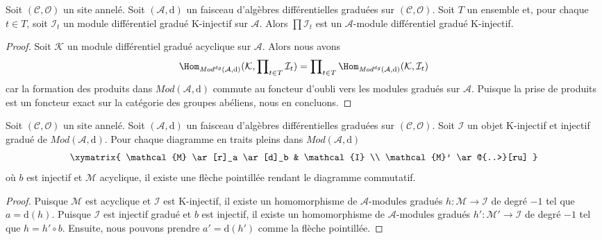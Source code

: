 \begin{lemma}
\label{lemma-product-K-injective}
Soit $(\mathcal{C}, \mathcal{O})$ un site annelé. Soit
$(\mathcal{A}, \text{d})$ un faisceau d'algèbres différentielles graduées sur
$(\mathcal{C}, \mathcal{O})$. Soit $T$ un ensemble et, pour
chaque $t \in T$, soit $\mathcal{I}_t$ un module différentiel
gradué K-injectif sur $\mathcal{A}$. Alors
$\prod \mathcal{I}_t$ est un
$\mathcal{A}$-module différentiel gradué K-injectif.
\end{lemma}

\begin{proof}
Soit $\mathcal{K}$ un module différentiel gradué acyclique sur $\mathcal{A}$. Alors
nous avons
$$
\Hom_{\textit{Mod}^{dg}(\mathcal{A}, \text{d})}(\mathcal{K},
\prod\nolimits_{t \in T} \mathcal{I}_t)
=
\prod\nolimits_{t \in T}
\Hom_{\textit{Mod}^{dg}(\mathcal{A}, \text{d})}(\mathcal{K}, \mathcal{I}_t)
$$ car la formation
des produits dans $\textit{Mod}(\mathcal{A}, \text{d})$ commute au
foncteur d'oubli vers les modules gradués sur $\mathcal{A}$. Puisque la
prise de produits est un foncteur exact sur la catégorie des groupes abéliens, nous
en concluons.
\end{proof}

\begin{lemma}
\label{lemma-first-property-dg-injective} Soit
$(\mathcal{C}, \mathcal{O})$ un site annelé. Soit
$(\mathcal{A}, \text{d})$ un
faisceau d'algèbres différentielles graduées sur $(\mathcal{C}, \mathcal{O})$. Soit
$\mathcal{I}$ un objet K-injectif et injectif gradué de
$\textit{Mod}(\mathcal{A}, \text{d})$. Pour chaque diagramme
en traits pleins dans $\textit{Mod}(\mathcal{A}, \text{d})$
$$
\xymatrix{
\mathcal{M} \ar[r]_a \ar[d]_b & \mathcal{I} \\
\mathcal{M}' \ar@{..>}[ru]
}
$$ où
$b$ est injectif et $\mathcal{M}$ acyclique, il existe une
flèche pointillée rendant le diagramme commutatif.
\end{lemma}

\begin{proof}
Puisque $\mathcal{M}$ est acyclique et $\mathcal{I}$ est K-injectif, il
existe un homomorphisme de $\mathcal{A}$-modules gradués
$h : \mathcal{M} \to \mathcal{I}$ de degré $-1$ tel
que $a = \text{d}(h)$. Puisque $\mathcal{I}$ est injectif gradué et
$b$ est injectif, il existe un homomorphisme de $\mathcal{A}$-modules gradués
$h' : \mathcal{M}' \to \mathcal{I}$ de degré $-1$ tel que
$h = h' \circ b$. Ensuite, nous pouvons prendre $a' = \text{d}(h')$ comme
la flèche pointillée.
\end{proof}

